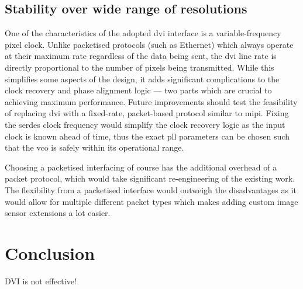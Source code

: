 \subsection{Stability over wide range of resolutions}

One of the characteristics of the adopted \gls{dvi} interface is a variable-frequency pixel clock. Unlike packetised protocols (such as Ethernet) which always operate at their maximum rate regardless of the data being sent, the \gls{dvi} line rate is directly proportional to the number of pixels being transmitted. While this simplifies some aspects of the design, it adds significant complications to the clock recovery and phase alignment logic --- two parts which are crucial to achieving maximum performance. Future improvements should test the feasibility of replacing \gls{dvi} with a fixed-rate, packet-based protocol similar to \gls{mipi}. Fixing the \gls{serdes} clock frequency would simplify the clock recovery logic as the input clock is known ahead of time, thus the exact \gls{pll} parameters can be chosen such that the \gls{vco} is safely within its operational range.

Choosing a packetised interfacing of course has the additional overhead of a packet protocol, which would take significant re-engineering of the existing work. The flexibility from a packetised interface would outweigh the disadvantages as it would allow for multiple different packet types which makes adding custom image sensor extensions a lot easier.

\section{Conclusion}

DVI is not effective!